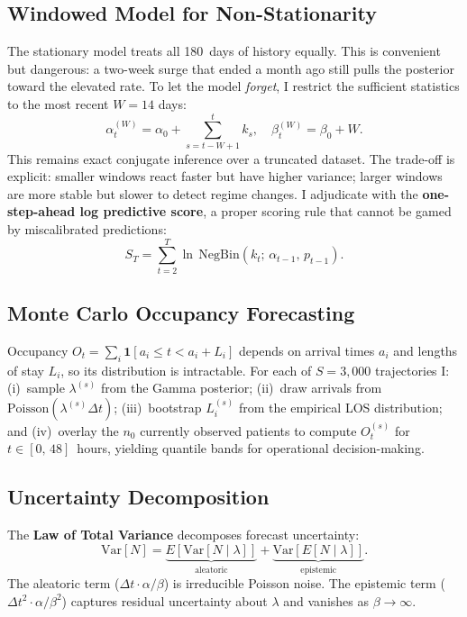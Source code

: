 \documentclass[10pt, twocolumn]{article}
\begin{document}
\subsection{Windowed Model for Non-Stationarity}

The stationary model treats all 180~days of history equally. This is
convenient but dangerous: a two-week surge that ended a month ago still
pulls the posterior toward the elevated rate. To let the model
\emph{forget}, I restrict the sufficient statistics to the most recent
$W = 14$ days:
\begin{equation}\label{eq:windowed}
    \alpha_t^{(W)} = \alpha_0 + \!\!\sum_{s=t-W+1}^{t} k_s, \quad
    \beta_t^{(W)} = \beta_0 + W.
\end{equation}
This remains exact conjugate inference over a truncated dataset. The
trade-off is explicit: smaller windows react faster but have higher
variance; larger windows are more stable but slower to detect regime
changes. I adjudicate with the \textbf{one-step-ahead log predictive
score}, a proper scoring rule that cannot be gamed by miscalibrated
predictions:
\begin{equation}\label{eq:logscore}
    S_T = \sum_{t=2}^{T}
    \ln\,\mathrm{NegBin}(k_t;\, \alpha_{t-1},\, p_{t-1}).
\end{equation}

\subsection{Monte Carlo Occupancy Forecasting}

Occupancy $O_t = \sum_i \mathbf{1}[a_i \le t < a_i + L_i]$ depends on
arrival times $a_i$ and lengths of stay $L_i$, so its distribution is
intractable. For each of $S = 3{,}000$ trajectories I:
(i)~sample $\lambda^{(s)}$ from the Gamma posterior;
(ii)~draw arrivals from $\mathrm{Poisson}(\lambda^{(s)} \Delta t)$;
(iii)~bootstrap $L_i^{(s)}$ from the empirical LOS distribution; and
(iv)~overlay the $n_0$ currently observed patients to compute
$O_t^{(s)}$ for $t \in [0,\, 48]$~hours, yielding quantile bands for
operational decision-making.

\subsection{Uncertainty Decomposition}

The \textbf{Law of Total Variance} decomposes forecast uncertainty:
\begin{equation}\label{eq:totvar}
    \mathrm{Var}[N] =
    \underbrace{E[\mathrm{Var}[N \mid \lambda]]}_{\text{aleatoric}}
    + \underbrace{\mathrm{Var}[E[N \mid \lambda]]}_{\text{epistemic}}.
\end{equation}
The aleatoric term ($\Delta t\cdot\alpha/\beta$) is irreducible Poisson
noise. The epistemic term ($\Delta t^2\cdot\alpha/\beta^2$) captures
residual uncertainty about $\lambda$ and vanishes as
$\beta\to\infty$.
\end{document}
